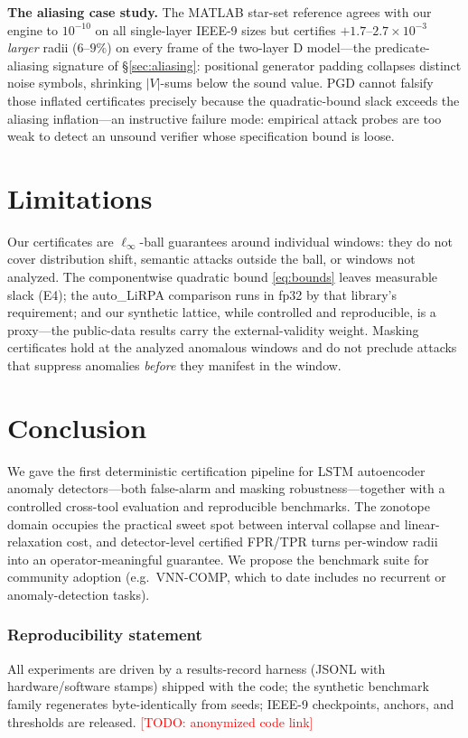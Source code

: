 \documentclass{article} %
\newcommand{\todo}[1]{\textcolor{red}{[TODO: #1]}}
\begin{document}
\textbf{The aliasing case study.} The MATLAB star-set reference agrees
with our engine to $10^{-10}$ on all single-layer IEEE-9 sizes but
certifies $+1.7$--$2.7\times10^{-3}$ \emph{larger} radii ($6$--$9\%$)
on every frame of the two-layer D model---the predicate-aliasing
signature of \S\ref{sec:aliasing}: positional generator padding
collapses distinct noise symbols, shrinking $|V|$-sums below the sound
value. PGD cannot falsify those inflated certificates precisely
because the quadratic-bound slack exceeds the aliasing inflation---an
instructive failure mode: empirical attack probes are too weak to
detect an unsound verifier whose specification bound is loose.

\section{Limitations}
\label{sec:limitations}

Our certificates are $\ell_\infty$-ball guarantees around individual
windows: they do not cover distribution shift, semantic attacks outside
the ball, or windows not analyzed. The componentwise quadratic bound
\eqref{eq:bounds} leaves measurable slack (E4); the auto\_LiRPA
comparison runs in fp32 by that library's requirement; and our
synthetic lattice, while controlled and reproducible, is a proxy---the
public-data results carry the external-validity weight. Masking
certificates hold at the analyzed anomalous windows and do not preclude
attacks that suppress anomalies \emph{before} they manifest in the
window.

\section{Conclusion}

We gave the first deterministic certification pipeline for LSTM
autoencoder anomaly detectors---both false-alarm and masking
robustness---together with a controlled cross-tool evaluation and
reproducible benchmarks. The zonotope domain occupies the practical
sweet spot between interval collapse and linear-relaxation cost, and
detector-level certified FPR/TPR turns per-window radii into an
operator-meaningful guarantee. We propose the benchmark suite for
community adoption (e.g.\ VNN-COMP, which to date includes no recurrent
or anomaly-detection tasks).

\subsubsection*{Reproducibility statement}
All experiments are driven by a results-record harness (JSONL with
hardware/software stamps) shipped with the code; the synthetic
benchmark family regenerates byte-identically from seeds; IEEE-9
checkpoints, anchors, and thresholds are released. \todo{anonymized
code link}
\end{document}
